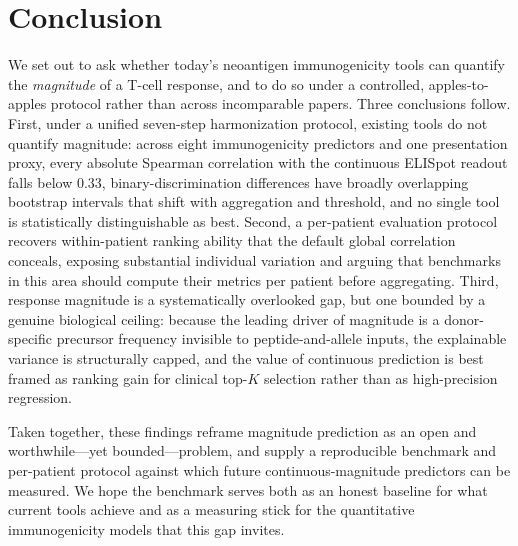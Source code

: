 \section{Conclusion}
\label{sec:conclusion}

We set out to ask whether today's neoantigen immunogenicity tools can quantify the
\emph{magnitude} of a T-cell response, and to do so under a controlled,
apples-to-apples protocol rather than across incomparable papers. Three
conclusions follow. First, under a unified seven-step harmonization protocol,
existing tools do not quantify magnitude: across eight immunogenicity predictors
and one presentation proxy, every absolute Spearman correlation with the
continuous ELISpot readout falls below $0.33$, binary-discrimination differences
have broadly overlapping bootstrap intervals that shift with aggregation and
threshold, and no single tool is statistically distinguishable as best. Second, a
per-patient evaluation protocol recovers within-patient ranking ability that the
default global correlation conceals, exposing substantial individual variation
and arguing that benchmarks in this area should compute their metrics per patient
before aggregating. Third, response magnitude is a systematically overlooked gap,
but one bounded by a genuine biological ceiling: because the leading driver of
magnitude is a donor-specific precursor frequency invisible to peptide-and-allele
inputs, the explainable variance is structurally capped, and the value of
continuous prediction is best framed as ranking gain for clinical
top-$K$ selection rather than as high-precision regression.

Taken together, these findings reframe magnitude prediction as an open and
worthwhile---yet bounded---problem, and supply a reproducible benchmark and
per-patient protocol against which future continuous-magnitude predictors can be
measured. We hope the benchmark serves both as an honest baseline for what current
tools achieve and as a measuring stick for the quantitative immunogenicity models
that this gap invites.
